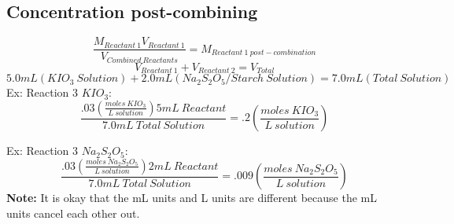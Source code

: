 \documentclass{article}
\begin{document}
\subsection{Concentration post-combining}
$$\frac{M_{Reactant\ 1}V_{Reactant\ 1}}{V_{Combined\ Reactants}} = M_{Reactant\ 1\ post-combination}$$
$$V_{Reactant\ 1} + V_{Reactant\ 2} = V_{Total}$$
$$5.0mL(KIO_3\ Solution) + 2.0mL(Na_2S_2O_5/Starch\ Solution) = 7.0mL(Total\ Solution)$$
Ex: Reaction 3 $KIO_3$: 
$$\frac{.03(\frac{moles\ KIO_3}{L\ solution})5mL\ Reactant}{7.0mL\ Total\ Solution} = .2(\frac{moles\ KIO_3}{L\ solution}) $$

Ex: Reaction 3 $Na_2S_2O_5$: 
$$\frac{.03(\frac{moles\ Na_2S_2O_5}{L\ solution})2mL\ Reactant}{7.0mL\ Total\ Solution} = .009(\frac{moles\ Na_2S_2O_5}{L\ solution}) $$
\textbf{Note:} It is okay that the mL units and L units are different because the mL units cancel each other out. 
\end{document}
